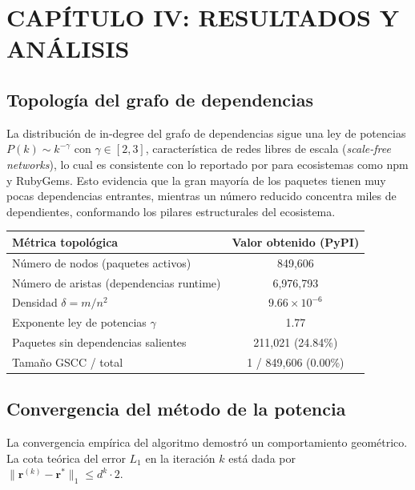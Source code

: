 \section{CAPÍTULO IV: RESULTADOS Y ANÁLISIS}

\subsection{Topología del grafo de dependencias}
La distribución de in-degree del grafo de dependencias sigue una ley de potencias
$P(k) \sim k^{-\gamma}$ con $\gamma \in [2, 3]$, característica de redes libres
de escala (\textit{scale-free networks}), lo cual es consistente con lo reportado por
\textcite{kikas2017structure} para ecosistemas como npm y RubyGems. Esto evidencia que la gran
mayoría de los paquetes tienen muy pocas dependencias entrantes, mientras un
número reducido concentra miles de dependientes, conformando los pilares estructurales del ecosistema.

\begin{center}
\begin{tabular}{lc}
\toprule
\textbf{Métrica topológica} & \textbf{Valor obtenido (PyPI)} \\
\midrule
Número de nodos (paquetes activos)        & 849,606 \\
Número de aristas (dependencias runtime)  & 6,976,793 \\
Densidad $\delta = m/n^2$                 & $9.66 \times 10^{-6}$ \\
Exponente ley de potencias $\gamma$       & 1.77 \\
Paquetes sin dependencias salientes       & 211,021 (24.84\%) \\
Tamaño GSCC / total                       & 1 / 849,606 (0.00\%) \\
\bottomrule
\end{tabular}
\end{center}

\subsection{Convergencia del método de la potencia}
La convergencia empírica del algoritmo demostró un comportamiento geométrico. La cota teórica del error $L_1$ en la iteración $k$ está dada por $\|\mathbf{r}^{(k)} - \mathbf{r}^*\|_1 \leq d^k \cdot 2$.


